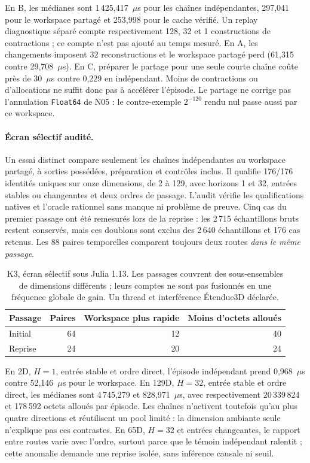 \documentclass[11pt,a4paper]{article}
\newcommand{\code}[1]{\texttt{#1}}
\begin{document}
En B, les médianes sont 1\,425,417~\(\mu\)s pour les chaînes
indépendantes, 297,041 pour le workspace partagé et 253,998 pour le
cache vérifié. Un replay diagnostique séparé compte respectivement
128, 32 et 1 constructions de contractions ; ce compte n'est pas
ajouté au temps mesuré. En A, les changements imposent 32
reconstructions et le workspace partagé perd (61,315 contre
29,708~\(\mu\)s). En C, préparer le partage pour une seule courte
chaîne coûte près de 30~\(\mu\)s contre 0,229 en indépendant.
Moins de contractions ou d'allocations ne suffit donc pas à accélérer
l'épisode. Le partage ne corrige pas l'annulation \code{Float64} de
N05 : le contre-exemple $2^{-120}$ rendu nul passe aussi par ce
workspace.

\paragraph{Écran sélectif audité.}
Un essai distinct compare seulement les chaînes indépendantes au
workspace partagé, à sorties possédées, préparation et contrôles inclus.
Il qualifie 176/176 identités uniques sur onze dimensions, de 2 à 129,
avec horizons 1 et 32, entrées stables ou changeantes et deux ordres
de passage. L'audit vérifie les qualifications natives
et l'oracle rationnel sans manque ni problème de preuve. Cinq cas du
premier passage ont été remesurés lors de la reprise : les 2\,715
échantillons bruts restent conservés, mais ces doublons sont exclus
des 2\,640 échantillons et 176 cas retenus. Les 88 paires temporelles
comparent toujours deux routes \emph{dans le même passage}.

\begin{table}[ht]
\centering\small
\begin{tabular}{@{}lrrr@{}}
\toprule
Passage & Paires & Workspace plus rapide & Moins d'octets alloués \\
\midrule
Initial & 64 & 12 & 40 \\
Reprise & 24 & 20 & 24 \\
\bottomrule
\end{tabular}
\caption{K3, écran sélectif sous Julia 1.13. Les passages couvrent
des sous-ensembles de dimensions différents ; leurs comptes ne sont
pas fusionnés en une fréquence globale de gain. Un thread et
interférence Étendue3D déclarée.}
\label{tab:k3screen}
\end{table}

En 2D, $H=1$, entrée stable et ordre direct, l'épisode indépendant
prend 0,968~\(\mu\)s contre 52,146~\(\mu\)s pour le workspace.
En 129D, $H=32$, entrée stable et ordre direct, les médianes sont
4\,745,279 et 828,971~\(\mu\)s, avec respectivement
20\,339\,824 et 178\,592 octets alloués par épisode. Les chaînes
n'activent toutefois qu'au plus quatre directions et réutilisent
un pool limité : la dimension ambiante seule n'explique pas ces
contrastes. En 65D, $H=32$ et entrées changeantes, le rapport entre
routes varie avec l'ordre, surtout parce que le témoin indépendant
ralentit ; cette anomalie demande une reprise isolée, sans inférence
causale ni seuil.
\end{document}
